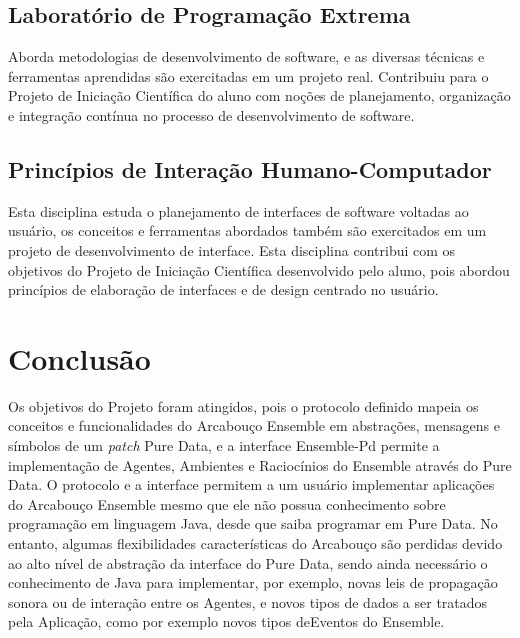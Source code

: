 \documentclass[a4paper, 11pt, twoside]{article}
\begin{document}
\begin{multicols}{2}
\subsection{Laboratório de Programação Extrema}

Aborda metodologias de desenvolvimento de software, e as
diversas técnicas e ferramentas aprendidas são exercitadas em
um projeto real. Contribuiu para o Projeto de Iniciação Científica
do aluno com noções de planejamento, organização e integração contínua
no processo de desenvolvimento de software.

\subsection{Princípios de Interação Humano-Computador}

Esta disciplina estuda o planejamento de interfaces de software voltadas 
ao usuário, os conceitos e ferramentas abordados também são exercitados
em um projeto de desenvolvimento de interface. Esta disciplina contribui com
os objetivos do Projeto de Iniciação Científica desenvolvido pelo aluno,
pois abordou princípios de elaboração de interfaces e de design centrado
no usuário.

\section{Conclusão}

Os objetivos do Projeto foram atingidos, pois o protocolo definido mapeia
os conceitos e funcionalidades do Arcabouço Ensemble em abstrações,
mensagens e símbolos de um \textit{patch} Pure Data, e a interface Ensemble-Pd
permite a implementação de Agentes, Ambientes e Raciocínios do Ensemble através
do Pure Data. O protocolo e a interface permitem a um usuário implementar 
aplicações do Arcabouço Ensemble mesmo que ele não possua conhecimento sobre
programação em linguagem Java, desde que saiba programar em Pure Data. 
No entanto, algumas flexibilidades características do Arcabouço são perdidas
devido ao alto nível de abstração da interface do Pure Data, sendo ainda 
necessário o conhecimento de Java para implementar, por exemplo, novas leis 
de propagação sonora ou de interação entre os Agentes, e novos tipos de dados
a ser tratados pela Aplicação, como por exemplo novos tipos deEventos do 
Ensemble.

\end{multicols}

\newpage


\end{document}

